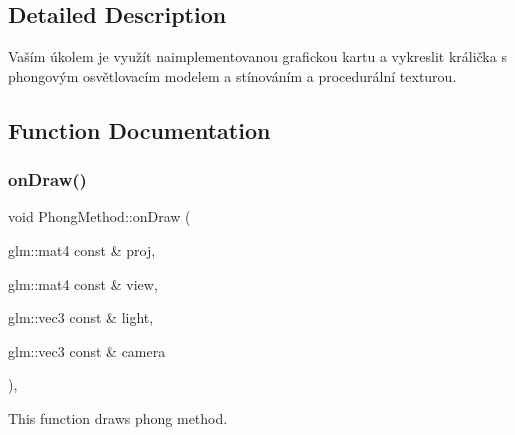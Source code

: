\subsection{Detailed Description}
Vaším úkolem je využít naimplementovanou grafickou kartu a vykreslit králička s phongovým osvětlovacím modelem a stínováním a procedurální texturou. 

\subsection{Function Documentation}
\mbox{\label{group__cpu__side_ga100e32901442800e1c155b5ce089f7c5}} 
\subsubsection{\texorpdfstring{on\+Draw()}{onDraw()}}
{\footnotesize\ttfamily void Phong\+Method\+::on\+Draw (\begin{DoxyParamCaption}\item[{glm\+::mat4 const \&}]{proj,  }\item[{glm\+::mat4 const \&}]{view,  }\item[{glm\+::vec3 const \&}]{light,  }\item[{glm\+::vec3 const \&}]{camera }\end{DoxyParamCaption})\hspace{0.3cm}{\ttfamily [override]}, {\ttfamily [virtual]}}



This function draws phong method. 



